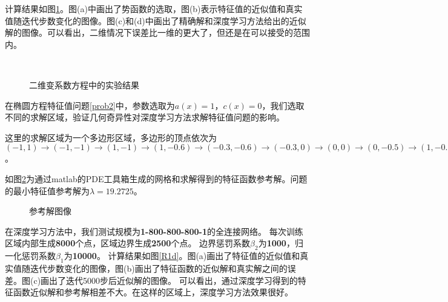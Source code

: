 计算结果如图\ref{fb3}。图(a)中画出了势函数的选取，图(b)表示特征值的近似值和真实值随迭代步数变化的图像。图(c)和(d)中画出了精确解和深度学习方法给出的近似解的图像。可以看出，二维情况下误差比一维的更大了，但还是在可以接受的范围内。

\begin{figure}[h]
\centering
{}
 \\
\caption{二维变系数方程中的实验结果}
\label{fb3}
\end{figure}


在椭圆方程特征值问题\ref{prob2}中，参数选取为$a(x)=1$，$c(x)=0$，我们选取不同的求解区域，验证几何奇异性对深度学习方法求解特征值问题的影响。


这里的求解区域为一个多边形区域，多边形的顶点依次为$(-1,1) \rightarrow (-1,-1) \rightarrow (1,-1) \rightarrow (1,-0.6) \rightarrow (-0.3,-0.6) \rightarrow (-0.3,0) \rightarrow (0,0) \rightarrow (0,-0.5) \rightarrow (1,-0.5) \rightarrow (1,1) \rightarrow (0.5,1) \rightarrow (0.5,0.3) \rightarrow (-1,1)$。

如图\ref{R1r}为通过matlab的PDE工具箱生成的网格和求解得到的特征函数参考解。问题的最小特征值参考解为$\lambda = 19.2725$。

\begin{figure}[h]
\centering
{}
\caption{参考解图像}
\label{R1r}
\end{figure}

在深度学习方法中，我们测试规模为\textbf{1-800-800-800-1}的全连接网络。
每次训练区域内部生成\textbf{8000}个点，区域边界生成\textbf{2500}个点。
边界惩罚系数$\beta_2$为\textbf{1000}，归一化惩罚系数$\beta_1$为\textbf{10000}。
计算结果如图\ref{R1d}。图(a)画出了特征值的近似值和真实值随迭代步数变化的图像，图(b)画出了特征函数的近似解和真实解之间的误差。图(c)画出了迭代5000步后近似解的图像。
可以看出，通过深度学习得到的特征函数近似解和参考解相差不大。在这样的区域上，深度学习方法效果很好。

